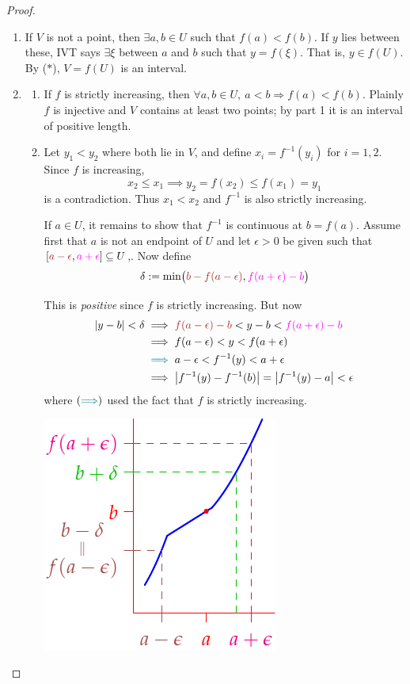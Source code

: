 \begin{proof}
	\begin{enumerate}
	  \item If $V$ is not a point, then $\exists a,b\in U$ such that $f(a)<f(b)$. If $y$ lies between these, IVT says $\exists\xi$ between $a$ and $b$ such that $y=f(\xi)$. That is, $y\in f(U)$. By ($\ast$), $V=f(U)$ is an interval.
	  \item\begin{enumerate}
	    \item If $f$ is strictly increasing, then $\forall a,b\in U,\ a<b\Longrightarrow f(a)<f(b)$. Plainly $f$ is injective and $V$ contains at least two points; by part 1 it is an interval of positive length.
	    \item Let $y_1<y_2$ where both lie in $V$, and define $x_i=f^{-1}(y_i)$ for $i=1,2$. Since $f$ is increasing,
			\[
				x_2\le x_1\implies y_2=f(x_2)\le f(x_1)=y_1
			\]
			is a contradiction. Thus $x_1<x_2$ and $f^{-1}$ is also strictly increasing.\par
			If $a\in U$, it remains to show that $f^{-1}$ is continuous at $b=f(a)$. Assume first that $a$ is not an endpoint of $U$ and let $\epsilon>0$ be given such that $[\textcolor{Brown}{a-\epsilon},\textcolor{Magenta}{a+\epsilon}]\subseteq U$,. Now define
			\[
				\delta:=\min\bigl(\textcolor{Brown}{b-f(a-\epsilon)},
					\textcolor{Magenta}{f(a+\epsilon)-b}\bigr)
			\]
			\begin{minipage}[t]{0.68\linewidth}\vspace{-2pt}
			This is \emph{positive} since $f$ is strictly increasing. But now
			\begin{align*}
				\nm{y-b}<\delta
				&\implies \textcolor{Brown}{f(a-\epsilon)-b}
					<y-b
					<\textcolor{Magenta}{f(a+\epsilon)-b}\\
				&\implies f(a-\epsilon)<y<f(a+\epsilon)\\
				&\mathrel{\textcolor{teal}{\implies}} a-\epsilon
					<f^{-1}(y)
					<a+\epsilon\\
				&\implies \nm{f^{-1}(y)-f^{-1}(b)}=\nm{f^{-1}(y)-a}<\epsilon
			\end{align*}
			where $(\textcolor{teal}{\Longrightarrow})$ used the fact that $f$ is strictly increasing.
			\end{minipage}
			\hfill
			\begin{minipage}[t]{0.31\linewidth}\vspace{-5pt}
				\flushright\includegraphics[scale=0.9]{inversecont2}

\end{minipage}
\end{enumerate}
\end{enumerate}
\end{proof}

